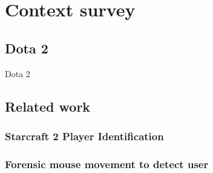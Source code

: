 \documentclass[Report.tex]{subfiles}
\begin{document}
\section{Context survey}


\subsection{Dota 2}

Dota 2

\subsection{Related work}

\subsubsection{Starcraft 2 Player Identification}

\subsubsection{Forensic mouse movement to detect user}
\end{document}
